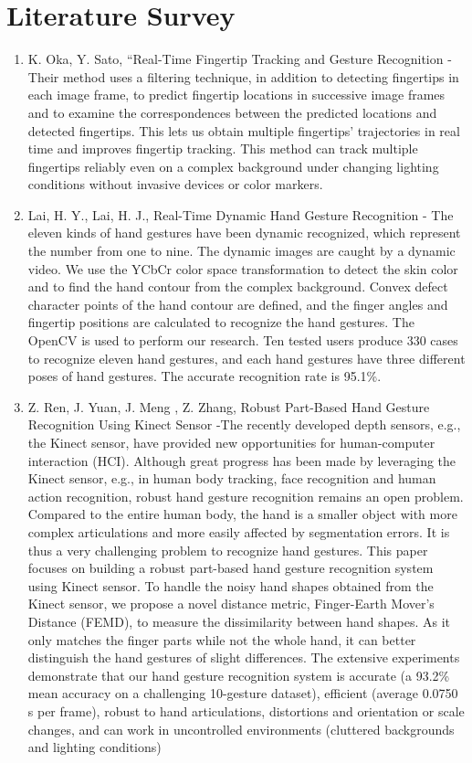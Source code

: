 \documentclass[11pt]{report}
\begin{document}
\section{Literature Survey}
\begin{enumerate}
    \item K. Oka, Y. Sato, “Real-Time Fingertip Tracking and Gesture Recognition - Their method uses a filtering technique, in addition to detecting fingertips  in  each  image  frame,  to predict fingertip locations in successive image frames and to examine the correspondences between the predicted locations and detected fingertips. This lets us obtain multiple fingertips’ trajectories in real time and improves fingertip tracking. This method can track multiple fingertips reliably even on a complex background under changing lighting conditions without invasive devices or color markers.
    
    \item Lai, H. Y., Lai, H. J., Real-Time Dynamic Hand Gesture Recognition - The  eleven  kinds  of  hand  gestures have  been  dynamic  recognized,  which  represent  the  number from  one  to  nine.  The  dynamic  images  are  caught  by  a  dynamic video.  We  use  the  YCbCr  color  space  transformation  to  detect the  skin  color  and  to  find  the  hand  contour from  the  complex background. Convex defect character points of the hand contour are  defined,  and  the  finger  angles  and  fingertip  positions  are calculated to recognize the hand gestures. The OpenCV is used to perform our research. Ten tested users produce 330 cases to recognize  eleven  hand  gestures,  and  each  hand  gestures  have  three different poses of hand gestures.  The accurate recognition rate is 95.1\%.

    \item Z. Ren, J. Yuan, J. Meng , Z. Zhang, Robust Part-Based Hand Gesture Recognition Using Kinect Sensor -The recently developed depth sensors, e.g., the Kinect sensor, have provided new opportunities for human-computer interaction (HCI). Although great progress has been made by leveraging the Kinect sensor, e.g., in human body tracking, face recognition and human action recognition, robust hand gesture recognition remains an open problem. Compared to the entire human body, the hand is a smaller object with more complex articulations and more easily affected by segmentation errors. It is thus a very challenging problem to recognize hand gestures. This paper focuses on building a robust part-based hand gesture recognition system using Kinect sensor. To handle the noisy hand shapes obtained from the Kinect sensor, we propose a novel distance metric, Finger-Earth Mover's Distance (FEMD), to measure the dissimilarity between hand shapes. As it only matches the finger parts while not the whole hand, it can better distinguish the hand gestures of slight differences. The extensive experiments demonstrate that our hand gesture recognition system is accurate (a 93.2\% mean accuracy on a challenging 10-gesture dataset), efficient (average 0.0750 s per frame), robust to hand articulations, distortions and orientation or scale changes, and can work in uncontrolled environments (cluttered backgrounds and lighting conditions) 
    

\end{enumerate}
\end{document}
